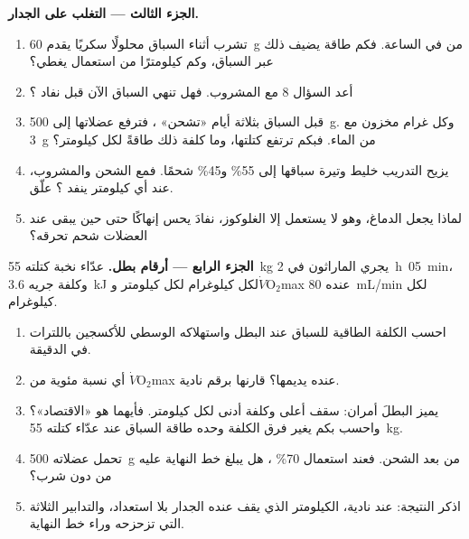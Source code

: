 \begin{problem}
\medskip
\noindent\textbf{الجزء الثالث --- التغلب على الجدار.}
\begin{enumerate}[resume]
  \item تشرب أثناء السباق محلولًا سكريًا يقدم \qty{60}{g} من
         في الساعة. فكم طاقة يضيف ذلك عبر السباق، وكم
        كيلومترًا من استعمال  يغطي؟
  \item أعد السؤال 8 مع المشروب. فهل تنهي السباق الآن قبل نفاد
        ؟
  \item قبل السباق بثلاثة أيام «تشحن» ، فترفع 
        عضلاتها إلى \qty{500}{g}. وكل غرام مخزون مع \qty{3}{g} من
        الماء. فبكم ترتفع كتلتها، وما كلفة ذلك طاقةً لكل كيلومتر؟
  \item يزيح التدريب خليط وتيرة سباقها إلى 55\%  و45\%
        شحمًا. فمع الشحن والمشروب، عند أي كيلومتر ينفد ؟
        علّق.
  \item لماذا يجعل الدماغ، وهو لا يستعمل إلا الغلوكوز، نفادَ
         يحس إنهاكًا حتى حين يبقى عند العضلات شحم تحرقه؟
\end{enumerate}

\medskip
\noindent\textbf{الجزء الرابع --- أرقام بطل.}
عدّاء نخبة كتلته \qty{55}{kg} يجري الماراثون في \qty{2}{h}\,
\qty{05}{min}، وكلفة جريه \qty{3.6}{kJ} لكل كيلوغرام لكل كيلومتر
و$\dot V\!\mathrm{O_2}$max عنده \qty{80}{mL/min} لكل كيلوغرام.
\begin{enumerate}[resume]
  \item احسب الكلفة الطاقية للسباق عند البطل واستهلاكه الوسطي
        للأكسجين باللترات في الدقيقة.
  \item أي نسبة مئوية من $\dot V\!\mathrm{O_2}$max عنده يديمها؟
        قارنها برقم نادية.
  \item يميز البطلَ أمران: سقف أعلى وكلفة أدنى لكل كيلومتر. فأيهما
        هو «الاقتصاد»؟ واحسب بكم يغير فرق الكلفة وحده طاقة السباق
        عند عدّاء كتلته \qty{55}{kg}.
  \item تحمل عضلاته \qty{500}{g} من  بعد الشحن. فعند
        استعمال 70\% ، هل يبلغ خط النهاية عليه من دون شرب؟
  \item اذكر النتيجة: عند نادية، الكيلومتر الذي يقف عنده الجدار بلا
        استعداد، والتدابير الثلاثة التي تزحزحه وراء خط النهاية.
\end{enumerate}
\end{problem}

